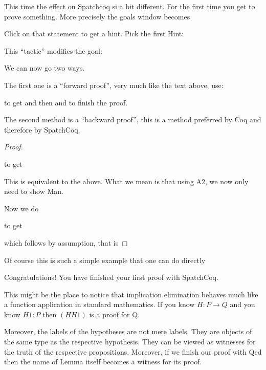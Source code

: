 \begin{itemize}
This time the effect on Spatchcoq si a bit different. For the first time you get to prove something. More precisely the goals window becomes


Click on  that statement to get a hint. Pick the first Hint:


This ``tactic'' modifies the goal:


We can now go two ways. 

The first one is a ``forward proof'', very much like the text above, use:

to get
and then 
and 
to finish the proof.

The second method is a ``backward proof'', this is a method preferred by Coq and therefore by SpatchCoq.
\begin{proof}\label{backward Socrates}
 
 
 to get

This is equivalent to the above. What we mean is that using A2, we now only need to show Man.

Now we do
 
 to get
 
 which follows by assumption, that is
 
 \end{proof}
 Of course this is such a simple example that one can do directly 
 
Congratulations! You have finished your first proof with SpatchCoq. 
 
 
\begin{tcolorbox}[colback=red!5!white,colframe=black]
This might be the place to notice that implication elimination behaves much like a function application in standard mathematics. If you know $H:P\rightarrow Q$  and you know $H1:P$ then $(H H1)$ is a proof for Q. 

Moreover, the labels of the hypotheses are not mere labels. They are objects of the same type as the respective hypothesis. They can be viewed as witnesses for the truth of the respective propositions. Moreover, if we finish our proof with Qed then the name of Lemma itself becomes a witness for its proof.


\end{tcolorbox}
\end{itemize}
